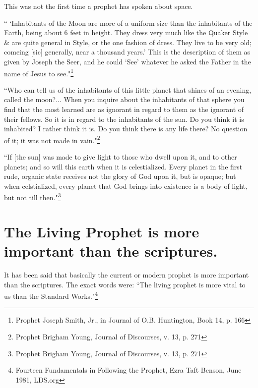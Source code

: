 This was not the first time a prophet has spoken about space.

\begin{displayquote}
`` `Inhabitants of the Moon are more of a uniform size than the inhabitants of the 
Earth, being about 6 feet in height. They dress very much like the Quaker Style \& 
are quite general in Style, or the one fashion of dress. They live to be very old; 
comeing [sic] generally, near a thousand years.' This is the description of them as 
given by Joseph the Seer, and he could `See' whatever he asked the Father in the 
name of Jesus to see."\footnote{
Prophet Joseph Smith, Jr., in Journal of O.B. Huntington, Book 14, p. 166
}
\end{displayquote}

\begin{displayquote}
``Who can tell us of the inhabitants of this little planet that shines of an evening,
called the moon?... When you inquire about the inhabitants of that sphere you find 
that the most learned are as ignorant in regard to them as the ignorant of their 
fellows. So it is in regard to the inhabitants of the sun. Do you think it is 
inhabited? I rather think it is. Do you think there is any life there? No question 
of it; it was not made in vain."\footnote{
Prophet Brigham Young, Journal of Discourses, v. 13, p. 271
}
\end{displayquote}

\begin{displayquote}
``If [the sun] was made to give light to those who dwell upon it, and to other
planets; and so will this earth when it is celestialized. Every planet in the first 
rude, organic state receives not the glory of God upon it, but is opaque; but when 
celstialized, every planet that God brings into existence is a body of light, but 
not till then."\footnote{
Prophet Brigham Young, Journal of Discourses, v. 13, p. 271
}
\end{displayquote}

\section{The Living Prophet is more important than the scriptures.}

It has been said that basically the current or modern prophet is more important than
the scriptures. The exact words were: 
``The living prophet is more vital to us than the Standard Works."\footnote{Fourteen 
Fundamentals in Following the Prophet, Ezra Taft Benson, June 1981, LDS.org}

